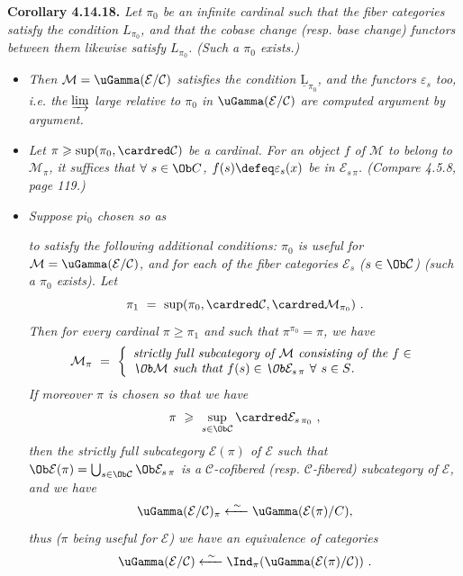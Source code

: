 \textbf{Corollary 4.14.18.} \textit{Let $\pi_0$ be an infinite cardinal such that the fiber categories satisfy the condition $L_{\pi_0}$, and that the cobase change (resp. base change) functors between them likewise satisfy $L_{\pi_0}$. (Such a $\pi_0$ exists.)}
\begin{itemize}[nosep]
\item[\circled{a}] \textit{Then $\mathcal{M} = \uGamma(\mathcal{E}/\mathcal{C})$ satisfies the condition $\underline{\mathrm{L}}_{\pi_0}$, and the functors $\varepsilon_s$ too, i.e. the $\varinjlim$ large relative to $\pi_0$ in $\uGamma(\mathcal{E}/\mathcal{C})$ are computed argument by argument.}
\item[\circled{b}] \textit{Let $\pi \geqslant \sup(\pi_0,\cardred\mathcal{C})$ be a cardinal. For an object $f$ of $\mathcal{M}$ to belong to $\mathcal{M}_\pi$, it \textup{suffices} that $\forall\ s \in \Ob C$, $f(s) \defeq \varepsilon_s(x)$ be in $\mathcal{E}_{s\,\pi}$. (Compare 4.5.8, page 119.)} %
\item[\circled{c}] \textit{Suppose $pi_0$ chosen so as} %

\textit{to satisfy the following additional conditions: $\pi_0$ is useful for $\mathcal{M} = \uGamma(\mathcal{E}/\mathcal{C})$, and for each of the fiber categories $\mathcal{E}_s$ ($s \in \Ob\mathcal{C}$) (such a $\pi_0$ exists). Let}
\[
\pi_1 \ = \ \sup(\pi_0, \cardred\mathcal{C}, \cardred\mathcal{M}_{\pi_0}) \ .
\]
\textit{Then for every cardinal $\pi \geqslant \pi_1$ and such that $\pi^{\pi_0} = \pi$, we have}
\[
\mathcal{M}_\pi \ = \ \left\{
\begin{array}{l}
\textit{strictly full subcategory of $\mathcal{M}$ consisting of the $f \in$} \\
\textit{$\Ob\mathcal{M}$ such that $f(s) \in \Ob\mathcal{E}_{s\,\pi}$ $\forall\ s \in S$.} %
\end{array}
\right.
\]
\textit{If moreover $\pi$ is chosen so that we have}
\[
\pi \ \geqslant \ \sup_{s\in\Ob\mathcal{C}} \cardred\mathcal{E}_{s\,\pi_0} \ ,
\]
\textit{then the strictly full subcategory $\mathcal{E}(\pi)$ of $\mathcal{E}$ such that $\Ob\mathcal{E}(\pi) = \bigcup_{s\in\Ob\mathcal{C}} \Ob\mathcal{E}_{s\,\pi}$ is a $\mathcal{C}$-cofibered (resp. $\mathcal{C}$-fibered) subcategory of $\mathcal{E}$, and we have}
\[
\uGamma(\mathcal{E}/\mathcal{C})_\pi \xleftarrow{\ \sim\ } \uGamma(\mathcal{E}(\pi)/C), %
\]
\textit{thus ($\pi$ being useful for $\mathcal{E}$) we have an equivalence of categories}
\[
\uGamma(\mathcal{E}/\mathcal{C}) \xleftarrow{\ \sim\ } \Ind_\pi(\uGamma(\mathcal{E}(\pi)/\mathcal{C})) \ .
\]
\end{itemize}